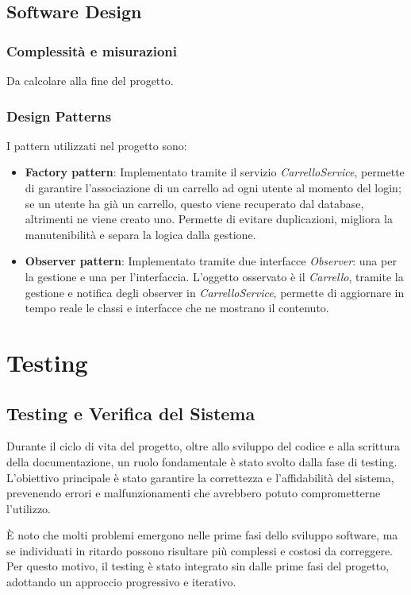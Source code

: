 \documentclass[a4paper,12pt]{article}
\begin{document}
\subsection{Software Design}
\subsubsection{Complessità e misurazioni}
Da calcolare alla fine del progetto. 
\subsubsection{Design Patterns}

I pattern utilizzati nel progetto sono:
\begin{itemize}
    \item \textbf{Factory pattern}: Implementato tramite il servizio \textit{CarrelloService}, permette di garantire l'associazione di un carrello ad ogni utente al momento del login; se un utente ha già un carrello,  questo viene recuperato dal database, altrimenti ne viene creato uno. Permette di evitare duplicazioni, migliora la manutenibilità e separa la logica dalla gestione.
    \item \textbf{Observer pattern}: Implementato tramite due interfacce \textit{Observer}: una per la gestione e una per l'interfaccia. L'oggetto osservato è il \textit{Carrello}, tramite la gestione e notifica degli observer in \textit{CarrelloService}, permette di aggiornare in tempo reale le classi e interfacce che ne mostrano il contenuto. 
\end{itemize}

\newpage
\section{Testing}
\subsection{Testing e Verifica del Sistema}
Durante il ciclo di vita del progetto, oltre allo sviluppo del codice e alla scrittura della documentazione, un ruolo fondamentale è stato svolto dalla fase di testing. L'obiettivo principale è stato garantire la correttezza e l'affidabilità del sistema, prevenendo errori e malfunzionamenti che avrebbero potuto comprometterne l’utilizzo.

È noto che molti problemi emergono nelle prime fasi dello sviluppo software, ma se individuati in ritardo possono risultare più complessi e costosi da correggere. Per questo motivo, il testing è stato integrato sin dalle prime fasi del progetto, adottando un approccio progressivo e iterativo.
\end{document}
